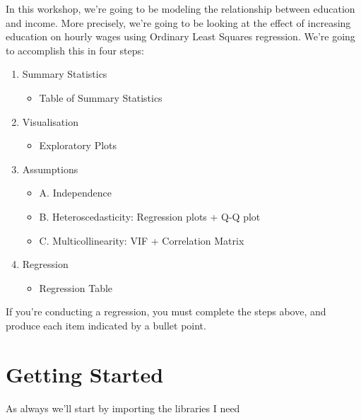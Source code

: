 \documentclass[
  letterpaper,
  DIV=11,
  numbers=noendperiod]{scrreprt}
\providecommand{\tightlist}{%
  \setlength{\itemsep}{0pt}\setlength{\parskip}{0pt}}\usepackage{longtable,booktabs,array}
\begin{document}
In this workshop, we're going to be modeling the relationship between
education and income. More precisely, we're going to be looking at the
effect of increasing education on hourly wages using Ordinary Least
Squares regression. We're going to accomplish this in four steps:

\begin{enumerate}
\def\labelenumi{\arabic{enumi}.}
\tightlist
\item
  Summary Statistics

  \begin{itemize}
  \tightlist
  \item
    Table of Summary Statistics
  \end{itemize}
\item
  Visualisation

  \begin{itemize}
  \tightlist
  \item
    Exploratory Plots
  \end{itemize}
\item
  Assumptions

  \begin{itemize}
  \tightlist
  \item
    A. Independence
  \item
    B. Heteroscedasticity: Regression plots + Q-Q plot
  \item
    C. Multicollinearity: VIF + Correlation Matrix
  \end{itemize}
\item
  Regression

  \begin{itemize}
  \tightlist
  \item
    Regression Table
  \end{itemize}
\end{enumerate}

If you're conducting a regression, you must complete the steps above,
and produce each item indicated by a bullet point.

\hypertarget{getting-started-3}{%
\section{Getting Started}\label{getting-started-3}}

As always we'll start by importing the libraries I need
\end{document}
